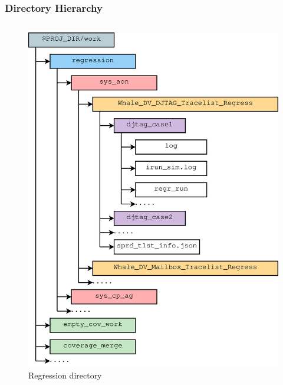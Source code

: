 \documentclass{beamer}
\begin{document}
\begin{frame}
  \frametitle{Directory Hierarchy}
  \begin{columns}[c] %

    \begin{figure}
      \centering
      \includegraphics[width=0.9\linewidth]{dir_regr_hier}
      \caption{Regression directory}
    \end{figure}


\end{columns}
\end{frame}
\end{document}
